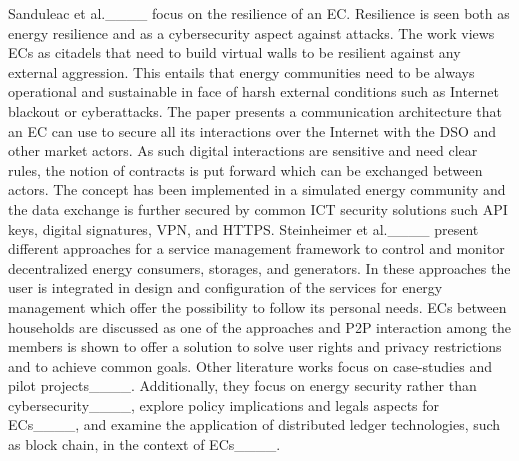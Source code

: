 Sanduleac et al.____ focus on the resilience of an EC. Resilience is seen both as energy resilience and as a cybersecurity aspect against attacks. The work views ECs as citadels that need to build virtual walls to be resilient against any external aggression. This entails that energy communities need to be always operational and sustainable in face of harsh external conditions such as Internet blackout or cyberattacks. The paper presents a communication architecture that an EC can use to secure all its interactions over the Internet with the DSO and other market actors. As such digital interactions are sensitive and need clear rules, the notion of contracts is put forward which can be exchanged between actors. The concept has been implemented in a simulated energy community and the data exchange is further secured by common ICT security solutions such API keys, digital signatures, VPN, and HTTPS. Steinheimer et al.____ present different approaches for a service management framework to control and monitor decentralized energy consumers, storages, and generators. In these approaches the user is integrated in design and configuration of the services for energy management which offer the possibility to follow its personal needs. ECs between  households are discussed as one of the approaches and P2P interaction among the members is shown to offer a solution to solve user rights and privacy restrictions and to achieve common goals. Other literature works focus on case-studies and pilot projects____. Additionally, they focus on energy security rather than cybersecurity____, explore policy implications and legals aspects for ECs____, and examine the application of distributed ledger technologies, such as block chain, in the context of ECs____. 



